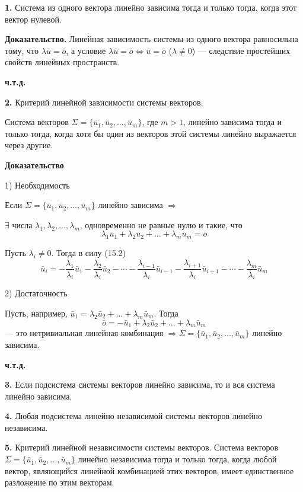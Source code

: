 \documentclass[12pt,a4paper]{article}
\newcommand{\vu}{\bar u}
\newcommand{\vo}{\bar o}
\begin{document}
\textbf{1.} Система из одного вектора линейно зависима тогда и только
тогда, когда этот вектор нулевой.

\textbf{Доказательство.} Линейная зависимость системы из одного
вектора равносильна тому, что $\lambda \vu = \vo$, а условие $\lambda
\vu = \vo \Leftrightarrow \vu = \vo$ ($\lambda \ne 0$) --- следствие
простейших свойств линейных пространств.

\textbf{ч.т.д.}

\textbf{2.} Критерий линейной зависимости системы векторов.

Система векторов $\Sigma = \{\vu_1, \vu_2, \ldots, \vu_m\}$, где $m >
1$, линейно зависима тогда и только тогда, когда хотя бы один из
векторов этой системы линейно выражается через другие.

\textbf{Доказательство}

1) Необходимость

Если $\Sigma = \{\vu_1, \vu_2, \ldots, \vu_m\}$ линейно зависима $\Rightarrow$

$\exists$ числа $\lambda_1, \lambda_2, \ldots, \lambda_m$,
одновременно не равные нулю и такие, что
\begin{equation}
\lambda_1 \vu_1 + \lambda_2 \vu_2 + \ldots + \lambda_m \vu_m = \vo \tag{15.2}
\end{equation}

Пусть $\lambda_i \ne 0$. Тогда в силу (15.2)
$$
\vu_i = -\frac{\lambda_1}{\lambda_i} \vu_1 -
\frac{\lambda_2}{\lambda_i} \vu_2 - \cdots -
\frac{\lambda_{i-1}}{\lambda_i} \vu_{i-1} -
\frac{\lambda_{i+1}}{\lambda_i} \vu_{i+1} - \cdots -
\frac{\lambda_m}{\lambda_i} \vu_m
$$

2) Достаточность

Пусть, например, $\vu_1 = \lambda_2 \vu_2 + \ldots + \lambda_m \vu_m$. Тогда
$$
\vo = -\vu_1 + \lambda_2 \vu_2 + \ldots + \lambda_m \vu_m
$$
--- это нетривиальная линейная комбинация $\Rightarrow \Sigma =
\{\vu_1, \vu_2, \ldots, \vu_m\}$ линейно зависима.

\textbf{ч.т.д.}

\textbf{3.} Если подсистема системы векторов линейно зависима, то и
вся система линейно зависима.

\textbf{4.} Любая подсистема линейно независимой системы векторов
линейно независима.

\textbf{5.} Критерий линейной независимости системы векторов. Система
векторов $\Sigma = \{\vu_1, \vu_2, \ldots, \vu_m\}$ линейно
независима тогда и только тогда, когда любой вектор, являющийся
линейной комбинацией этих векторов, имеет единственное разложение по
этим векторам.
\end{document}
